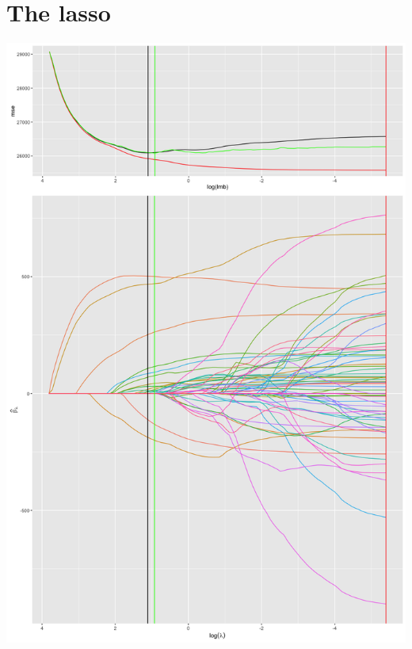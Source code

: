 \documentclass{article}
\begin{document}
\section{The lasso}

\includegraphics[scale=0.35]{overall.png}
\end{document}
